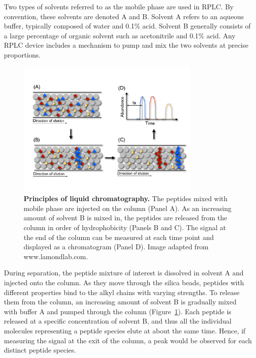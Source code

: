 \documentclass[a4paper]{article}
\begin{document}
Two types of solvents referred to as the mobile phase are used in
RPLC. By convention, these solvents are denoted A and B. Solvent A
refers to an aqueous buffer, typically composed of water and 0.1\%
acid. Solvent B generally consists of a large percentage of organic
solvent such as acetonitrile and 0.1\% acid. Any RPLC device includes
a mechanism to pump and mix the two solvents at precise proportions.

\begin{figure}[!h]
\centering
\includegraphics[trim=0.5cm 2.8cm 0.5cm 3.5cm, clip=true, width=0.8\textwidth]{img/rplc.pdf}
\caption{\label{fig:rplc} {\bf Principles of liquid chromatography.}
  The peptides mixed with mobile phase are injected on the column
  (Panel A). As an increasing amount of solvent B is mixed in, the
  peptides are released from the column in order of hydrophobicity
  (Panels B and C). The signal at the end of the column can be
  measured at each time point and displayed as a chromatogram (Panel
  D). Image adapted from www.lamondlab.com.}
\vspace{-7pt}
\end{figure}

During separation, the peptide mixture of interest is dissolved in
solvent A and injected onto the column. As they move through the
silica beads, peptides with different properties bind to the alkyl
chains with varying strengths. To release them from the column, an
increasing amount of solvent B is gradually mixed with buffer A and
pumped through the column (Figure~\ref{fig:rplc}). Each peptide is
released at a specific concentration of solvent B, and thus all the
individual molecules representing a peptide species elute at about the
same time.  Hence, if measuring the signal at the exit of the column,
a peak would be observed for each distinct peptide species.
\end{document}
